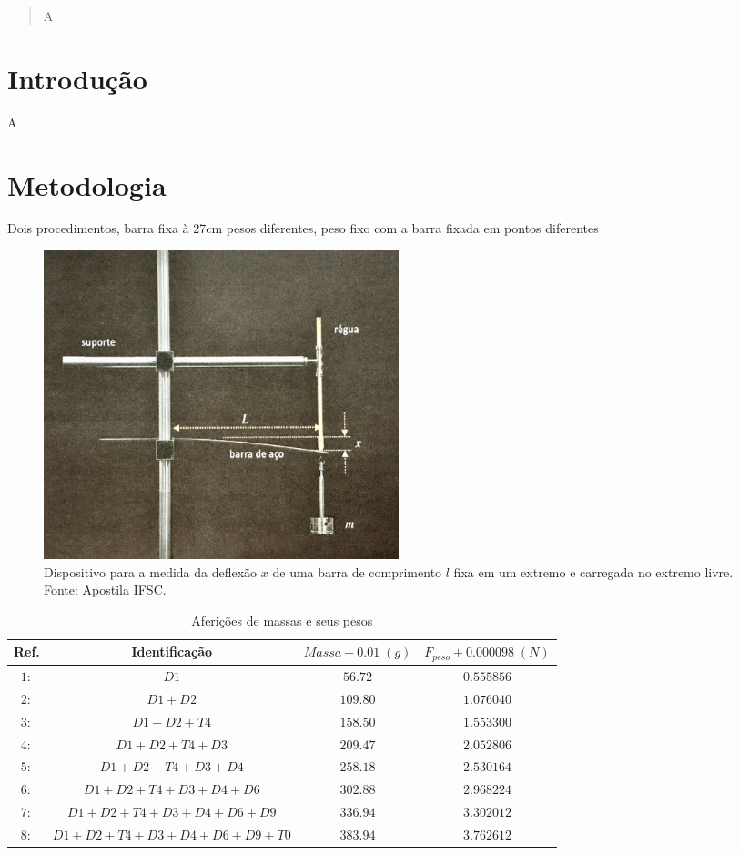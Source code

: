 \documentclass{article}
\begin{document}
\begin{abstract}
\indent
A

\end{abstract}
\newpage
\section{Introdução}
\indent
A

\section{Metodologia}

\indent

Dois procedimentos, barra fixa à 27cm pesos diferentes, peso fixo com a barra fixada em pontos diferentes

\begin{figure}[!ht]
    \centering
    \includegraphics[width=0.5\textwidth]{IMG_1472.jpg}
    \caption{Dispositivo para a medida da deflexão $x$ de uma barra de comprimento $l$ fixa em um extremo e carregada no extremo livre. Fonte: Apostila IFSC.}
    \label{fig:disp}
\end{figure}

\begin{table}[!ht]
    \centering
    \begin{tabular}{c c|c|c}
        Ref. & Identificação & $Massa\pm 0.01\;(g)$ & $F_{peso}\pm0.000098\;(N)$ \\\hline
        $1:$ & $D1$ & $56.72$ & $0.555856$\\
        $2:$ & $D1 + D2$ & $109.80$ & $1.076040$\\
        $3:$ & $D1 + D2 + T4$ & $158.50$ & $1.553300$\\
        $4:$ & $D1 + D2 + T4 + D3$ & $209.47$ & $2.052806$\\
        $5:$ & $D1 + D2 + T4 + D3 + D4$ & $258.18$ & $2.530164$\\
        $6:$ & $D1 + D2 + T4 + D3 + D4 + D6$ & $302.88$ & $2.968224$\\
        $7:$ & $D1 + D2 + T4 + D3 + D4 + D6 + D9$ & $336.94$ & $3.302012$\\
        $8:$ & $D1 + D2 + T4 + D3 + D4 + D6 + D9 +T0$ & $383.94$ & $3.762612$\\
    \end{tabular}
    \caption{Aferições de massas e seus pesos}
    \label{tab:pesos}
\end{table}
\end{document}
